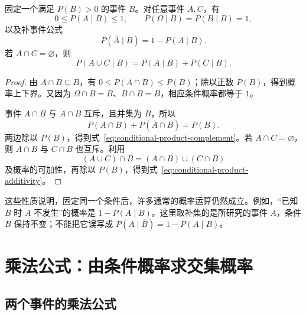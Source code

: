 \documentclass[UTF8]{ctexart}
\begin{document}
\begin{proposition}[条件概率的基本性质]
\label{prop:conditional-product-properties}
固定一个满足 $P(B)>0$ 的事件 $B$。对任意事件 $A,C$，有
\begin{equation}
  0\le P(A\mid B)\le1,\qquad
  P(\Omega\mid B)=P(B\mid B)=1,
  \label{eq:conditional-product-bounds}
\end{equation}
以及补事件公式
\begin{equation}
  P(\overline A\mid B)=1-P(A\mid B).
  \label{eq:conditional-product-complement}
\end{equation}
若 $A\cap C=\varnothing$，则
\begin{equation}
  P(A\cup C\mid B)=P(A\mid B)+P(C\mid B).
  \label{eq:conditional-product-additivity}
\end{equation}
\end{proposition}
\begin{proof}
由 $A\cap B\subseteq B$，有 $0\le P(A\cap B)\le P(B)$；除以正数 $P(B)$，得到概率上下界。又因为 $\Omega\cap B=B$、$B\cap B=B$，相应条件概率都等于 $1$。

事件 $A\cap B$ 与 $\overline A\cap B$ 互斥，且并集为 $B$，所以
\[
  P(A\cap B)+P(\overline A\cap B)=P(B).
\]
两边除以 $P(B)$，得到式~\eqref{eq:conditional-product-complement}。若 $A\cap C=\varnothing$，则 $A\cap B$ 与 $C\cap B$ 也互斥。利用
\[
  (A\cup C)\cap B=(A\cap B)\cup(C\cap B)
\]
及概率的可加性，再除以 $P(B)$，得到式~\eqref{eq:conditional-product-additivity}。
\end{proof}

这些性质说明，固定同一个条件后，许多通常的概率运算仍然成立。例如，“已知 $B$ 时 $A$ 不发生”的概率是 $1-P(A\mid B)$。这里取补集的是所研究的事件 $A$，条件 $B$ 保持不变；不能把它误写成 $P(A\mid\overline B)=1-P(A\mid B)$。

\section{乘法公式：由条件概率求交集概率}
\label{sec:conditional-product-rule}

\subsection{两个事件的乘法公式}
\end{document}
